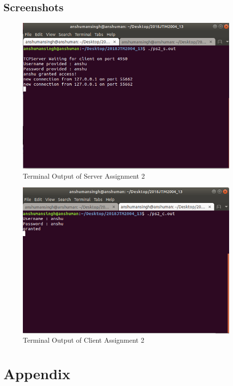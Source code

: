 \documentclass[12pt]{article}
\begin{document}
		\subsection{Screenshots}
			\begin{figure}[h!]
				\centering
				\caption{Terminal Output of Server Assignment 2}
				\includegraphics[scale=.55]{ps2_o_1.png}
			\end{figure}
			\begin{figure}[h!]
				\centering
				\caption{Terminal Output of Client Assignment 2}
				\includegraphics[scale=.55]{ps2_o_2.png}
			\end{figure}
	\newpage
	\section{Appendix}
	
\end{document}

